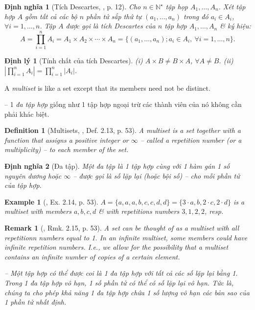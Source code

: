 \documentclass[oneside]{book}
\newtheorem{definition}{Definition}
\newtheorem{dinhly}{Định lý}
\newtheorem{dinhnghia}{Định nghĩa}
\newtheorem{example}{Example}
\newtheorem{remark}{Remark}
\begin{document}
\begin{dinhnghia}[Tích Descartes, \cite{Phuong_to_hop}, p. 12]
	Cho $n\in\mathbb{N}^\star$ tập họp $A_1,\ldots,A_n$. Xét tập hợp $A$ gồm tất cả các bộ $n$ phần tử sắp thứ tự $(a_1,\ldots,a_n)$ trong đó $a_i\in A_i$, $\forall i = 1,\ldots,n$. Tập $A$ được gọi là {\rm tích Descartes} của $n$ tập hợp $A_1,\ldots,A_n$ \& ký hiệu:
	\begin{equation*}
		A = \prod_{i=1}^n A_i = A_1\times A_2\times\cdots\times A_n = \{(a_1,\ldots,a_n);a_i\in A_i,\ \forall i = 1,\ldots,n\}.
	\end{equation*}
\end{dinhnghia}

\begin{dinhly}[Tính chất của tích Descartes]
	(i) $A\times B\ne B\times A$, $\forall A\ne B$. (ii) $|\prod_{i=1}^n A_i| = \prod_{i=1}^n |A_i|$.
\end{dinhly}
A {\it multiset} is like a set except that its members need not be distinct.

-- 1 {\it đa tập hợp} giống như 1 tập hợp ngoại trừ các thành viên của nó không cần phải khác biệt.

\begin{definition}[Multisets, \cite{Shahriari2022}, Def. 2.13, p. 53]
	A {\rm multiset} is a set together with a function that assigns a positive integer or $\infty$ -- called a {\rm repetition number} (or a {\rm multiplicity}) -- to each member of the set.
\end{definition}

\begin{dinhnghia}[Đa tập]
	Một {\rm đa tập} là 1 tập hợp cùng với 1 hàm gán 1 số nguyên dương hoặc $\infty$ -- được gọi là {\rm số lặp lại} (hoặc {\rm bội số}) -- cho mỗi phần tử của tập hợp.
\end{dinhnghia}

\begin{example}[\cite{Shahriari2022}, Ex. 2.14, p. 53]
	$A = \{a,a,a,b,c,c,d,d\} = \{3\cdot a,b,2\cdot c,2\cdot d\}$ is a multiset with members $a,b,c,d$ \& with repetitions numbers $3,1,2,2$, resp.
\end{example}

\begin{remark}[\cite{Shahriari2022}, Rmk. 2.15, p. 53]
	A set can be thought of as a multiset with all repetitionn numbers equal to 1. In an infinite multiset, some members could have infinite repetition numbers. I.e., we allow for the possibility that a multiset contains an infinite number of copies of a certain element.
	
	-- Một tập hợp có thể được coi là 1 đa tập hợp với tất cả các số lặp lại bằng 1. Trong 1 đa tập hợp vô hạn, 1 số phần tử có thể có số lặp lại vô hạn. Tức là, chúng ta cho phép khả năng 1 đa tập hợp chứa 1 số lượng vô hạn các bản sao của 1 phần tử nhất định.
\end{remark}
\end{document}
